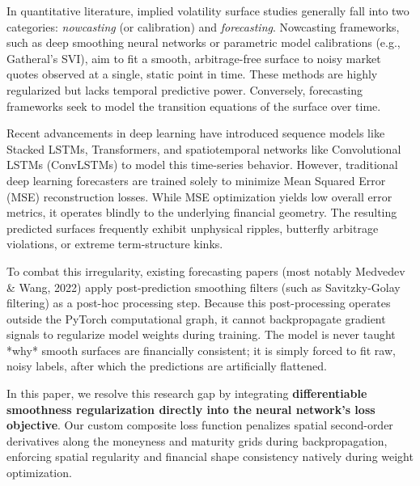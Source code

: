 \documentclass[conference]{IEEEtran}
\begin{document}
In quantitative literature, implied volatility surface studies generally fall into two categories: \emph{nowcasting} (or calibration) and \emph{forecasting}. Nowcasting frameworks, such as deep smoothing neural networks or parametric model calibrations (e.g., Gatheral's SVI), aim to fit a smooth, arbitrage-free surface to noisy market quotes observed at a single, static point in time. These methods are highly regularized but lacks temporal predictive power. Conversely, forecasting frameworks seek to model the transition equations of the surface over time. 

Recent advancements in deep learning have introduced sequence models like Stacked LSTMs, Transformers, and spatiotemporal networks like Convolutional LSTMs (ConvLSTMs) to model this time-series behavior. However, traditional deep learning forecasters are trained solely to minimize Mean Squared Error (MSE) reconstruction losses. While MSE optimization yields low overall error metrics, it operates blindly to the underlying financial geometry. The resulting predicted surfaces frequently exhibit unphysical ripples, butterfly arbitrage violations, or extreme term-structure kinks. 

To combat this irregularity, existing forecasting papers (most notably Medvedev \& Wang, 2022) apply post-prediction smoothing filters (such as Savitzky-Golay filtering) as a post-hoc processing step. Because this post-processing operates outside the PyTorch computational graph, it cannot backpropagate gradient signals to regularize model weights during training. The model is never taught *why* smooth surfaces are financially consistent; it is simply forced to fit raw, noisy labels, after which the predictions are artificially flattened.

In this paper, we resolve this research gap by integrating \textbf{differentiable smoothness regularization directly into the neural network's loss objective}. Our custom composite loss function penalizes spatial second-order derivatives along the moneyness and maturity grids during backpropagation, enforcing spatial regularity and financial shape consistency natively during weight optimization. 
\end{document}
